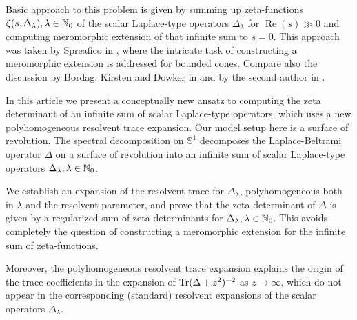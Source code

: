Basic approach to this problem is given by summing up zeta-functions 
$\zeta(s,\Delta_\lambda), \lambda \in \mathbb{N}_0$ of the scalar Laplace-type operators 
$\Delta_\lambda$ for $\operatorname{Re}(s) \gg 0$ and computing
meromorphic extension of that infinite sum to $s=0$. This approach was taken by Spreafico 
in \cite{Spr:ZFA, Spr:ZIF}, where the intricate task of constructing a meromorphic extension 
is addressed for bounded cones. Compare also the discussion by Bordag, Kirsten and 
Dowker in \cite{BKD:HKA} and by the second author in \cite{Ver:ATO}.

In this article we present a conceptually new ansatz to computing the zeta determinant 
of an infinite sum of scalar Laplace-type operators, which uses a new polyhomogeneous 
resolvent trace expansion. Our model setup here is a surface of 
revolution. The spectral decomposition on $\mathbb{S}^1$ decomposes the Laplace-Beltrami operator 
$\Delta$ on a surface of revolution into an infinite sum of scalar Laplace-type operators 
$\Delta_\lambda, \lambda \in \mathbb{N}_0$. 

We establish an expansion of the resolvent trace for $\Delta_\lambda$, 
polyhomogeneous both in $\lambda$ and the resolvent parameter, and prove that 
the zeta-determinant of $\Delta$ is given by a regularized sum of zeta-determinants for 
$\Delta_\lambda, \lambda \in \mathbb{N}_0$. This avoids completely the question
of constructing a meromorphic extension for the infinite sum of zeta-functions. 

Moreover, the polyhomogeneous resolvent trace expansion explains 
the origin of the trace coefficients in the expansion of 
$\operatorname{Tr}(\Delta+z^2)^{-2}$ as $z\to \infty$, which do not appear in the 
corresponding (standard) resolvent expansions of the scalar operators $\Delta_\lambda$. 

